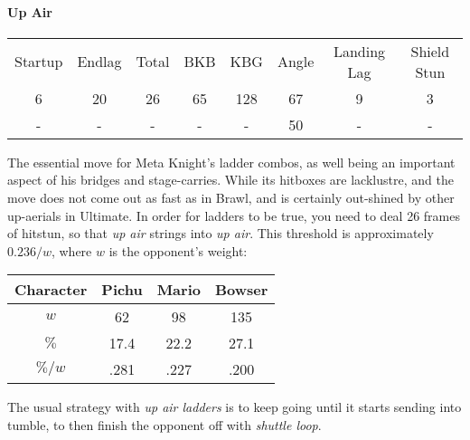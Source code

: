 \paragraph{Up Air}
\begin{center}
	\begin{tabular}{| c  c  c | c  c  c | c  c |}
		\hline
		Startup	& Endlag & Total & BKB & KBG & Angle &	Landing Lag	&	Shield Stun	\\
		6	&	20	&	26	&	65	&	128 & 	67\deg	&	9 	&	3	\\
		-	&	-	&	-	&	- 	& 	- 	&	50\deg	&	-	&	-	\\
		\hline
	\end{tabular}
\end{center}
The essential move for Meta Knight's ladder combos, as well  being an important aspect of his bridges and stage-carries. While its hitboxes are lacklustre, and the move does not come out as fast as in Brawl, and is certainly out-shined by other up-aerials in Ultimate. In order for ladders to be true, you need to deal 26 frames of hitstun, so that \textit{up air} strings into \emph{up air}. This threshold is approximately $0.236/w$, where $w$ is the opponent's weight:
\begin{center}
	\begin{tabular}{| c c c c |}
		\hline
		\textbf{Character} & Pichu & Mario & Bowser	\\
		\hline
		$w$		&	62		&	98		&	135		\\
		$\%$	&	17.4	&	22.2	&	27.1	\\
		$\%/w$	&	.281	&	.227	&	.200	\\
		\hline
	\end{tabular}
\end{center}
The usual strategy with \textit{up air ladders} is to keep going until it starts sending into tumble, to then finish the opponent off with \textit{shuttle loop}.

